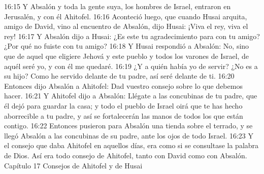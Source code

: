 16:15 Y Absalón y toda la gente suya, los hombres de Israel, entraron en Jerusalén, y con él Ahitofel.  
16:16 Aconteció luego, que cuando Husai arquita, amigo de David, vino al encuentro de Absalón, dijo Husai: ¡Viva el rey, viva el rey!  
16:17 Y Absalón dijo a Husai: ¿Es este tu agradecimiento para con tu amigo? ¿Por qué no fuiste con tu amigo?  
16:18 Y Husai respondió a Absalón: No, sino que de aquel que eligiere Jehová y este pueblo y todos los varones de Israel, de aquél seré yo, y con él me quedaré.  
16:19 ¿Y a quién había yo de servir? ¿No es a su hijo? Como he servido delante de tu padre, así seré delante de ti.  
16:20 Entonces dijo Absalón a Ahitofel: Dad vuestro consejo sobre lo que debemos hacer.  
16:21 Y Ahitofel dijo a Absalón: Llégate a las concubinas de tu padre, que él dejó para guardar la casa; y todo el pueblo de Israel oirá que te has hecho aborrecible a tu padre, y así se fortalecerán las manos de todos los que están contigo.  
16:22 Entonces pusieron para Absalón una tienda sobre el terrado, y se llegó Absalón a las concubinas de su padre, ante los ojos de todo Israel. 
16:23 Y el consejo que daba Ahitofel en aquellos días, era como si se consultase la palabra de Dios. Así era todo consejo de Ahitofel, tanto con David como con Absalón.  
Capítulo 17 
Consejos de Ahitofel y de Husai  

